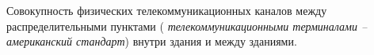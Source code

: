 Совокупность физических телекоммуникационных каналов
между распределительными пунктами ({\it 
телекоммуникационными терминалами -- американский стандарт})
внутри здания и между зданиями.